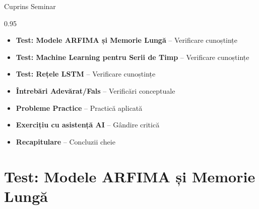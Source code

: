 \documentclass[9pt, aspectratio=169, t]{beamer}
\subtitle{Seminar 8: Extensii Moderne}
\begin{document}
{
\begin{frame}
    \titlepage
\end{frame}
}

\begin{frame}{Cuprins Seminar}
    \begin{cminipage}{0.95\textwidth}
    \begin{itemize}\setlength{\itemsep}{0pt}
        \item \textbf{Test: Modele ARFIMA și Memorie Lungă} -- Verificare cunoștințe
        \vspace{0.15cm}
        \item \textbf{Test: Machine Learning pentru Serii de Timp} -- Verificare cunoștințe
        \vspace{0.15cm}
        \item \textbf{Test: Rețele LSTM} -- Verificare cunoștințe
        \vspace{0.15cm}
        \item \textbf{Întrebări Adevărat/Fals} -- Verificări conceptuale
        \vspace{0.15cm}
        \item \textbf{Probleme Practice} -- Practică aplicată
        \vspace{0.15cm}
        \item \textbf{Exercițiu cu asistență AI} -- Gândire critică
        \vspace{0.15cm}
        \item \textbf{Recapitulare} -- Concluzii cheie
    \end{itemize}
    \end{cminipage}
\end{frame}


\section{Test: Modele ARFIMA și Memorie Lungă}
\end{document}

